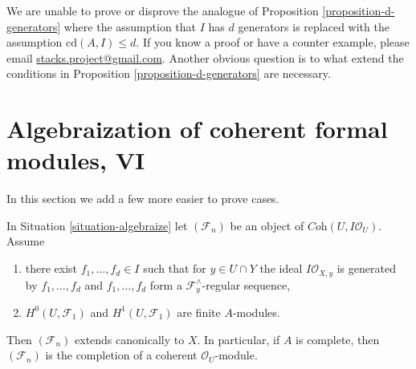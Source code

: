 \begin{remark}
\label{remark-question}
We are unable to prove or disprove the analogue of
Proposition \ref{proposition-d-generators}
where the assumption that $I$ has $d$ generators
is replaced with the assumption $\text{cd}(A, I) \leq d$.
If you know a proof or have a counter example, please email
\href{mailto:stacks.project@gmail.com}{stacks.project@gmail.com}.
Another obvious question is to what extend the conditions in
Proposition \ref{proposition-d-generators}
are necessary.
\end{remark}




\section{Algebraization of coherent formal modules, VI}
\label{section-algebraization-modules-yet-more}

\noindent
In this section we add a few more easier to prove cases.

\begin{proposition}
\label{proposition-algebraization-regular-sequence}
In Situation \ref{situation-algebraize} let
$(\mathcal{F}_n)$ be an object of $\textit{Coh}(U, I\mathcal{O}_U)$.
Assume
\begin{enumerate}
\item there exist $f_1, \ldots, f_d \in I$ such that
for $y \in U \cap Y$ the ideal $I\mathcal{O}_{X, y}$
is generated by $f_1, \ldots, f_d$ and
$f_1, \ldots, f_d$ form a $\mathcal{F}_y^\wedge$-regular sequence,
\item $H^0(U, \mathcal{F}_1)$ and $H^1(U, \mathcal{F}_1)$
are finite $A$-modules.
\end{enumerate}
Then $(\mathcal{F}_n)$ extends canonically to $X$. In particular, if $A$
is complete, then $(\mathcal{F}_n)$ is the completion of a coherent
$\mathcal{O}_U$-module.
\end{proposition}


